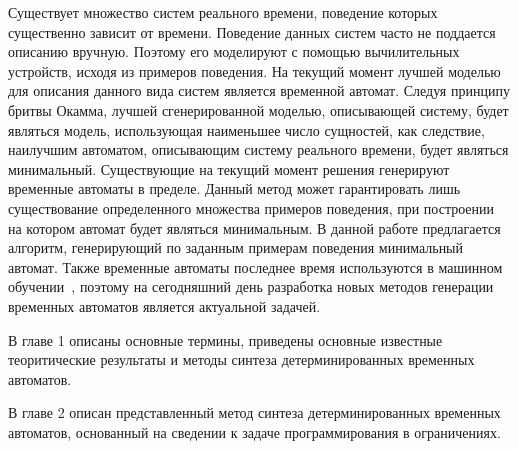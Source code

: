 \documentclass[times,specification,annotation]{itmo-student-thesis}
\begin{document}





\tableofcontents

\startprefacepage

Существует множество систем реального времени, поведение которых существенно зависит от времени. Поведение данных систем часто не поддается описанию вручную. Поэтому его
моделируют с помощью вычилительных устройств, исходя из примеров поведения. На текущий момент лучшей моделью для описания данного вида систем является временной автомат.
Следуя принципу бритвы Окамма, лучшей сгенерированной моделью, описывающей систему, будет являться модель, использующая наименьшее число сущностей, как следствие,
наилучшим автоматом, описывающим систему реального времени, будет являться минимальный. Существующие на текущий момент решения генерируют временные
автоматы в пределе. Данный метод может гарантировать лишь существование определенного множества примеров поведения, при построении на котором автомат будет являться минимальным.
В данной работе предлагается алгоритм, генерирующий по заданным примерам поведения минимальный автомат. Также временные автоматы последнее время используются в машинном обучении~\cite{moha}, 
поэтому на сегодняшний день разработка новых методов генерации временных автоматов является актуальной задачей. 

В главе 1 описаны основные термины, приведены основные известные теоритические результаты и методы синтеза детерминированных временных автоматов.

В главе 2 описан представленный метод синтеза детерминированных временных автоматов, основанный на сведении к задаче программирования в ограничениях.
\end{document}
